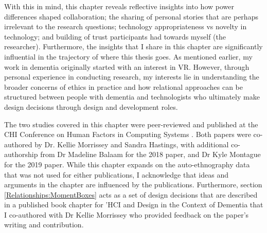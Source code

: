 With this in mind, this chapter reveals reflective insights into how power differences shaped collaboration; the sharing of personal stories that are perhaps irrelevant to the research questions; technology appropriateness vs novelty in technology; and building of trust participants had towards myself (the researcher). Furthermore, the insights that I share in this chapter are significantly influential in the trajectory of where this thesis goes. As mentioned earlier, my work in dementia originally started with an interest in VR. However, through personal experience in conducting research, my interests lie in understanding the broader concerns of ethics in practice and how relational approaches can be structured between people with dementia and technologists who ultimately make design decisions through design and development roles.


The two studies covered in this chapter were peer-reviewed and published at the CHI Conference on Human Factors in Computing Systems \citep{hodge_exploring_2018,hodge_exploring_2019}. Both papers were co-authored by Dr. Kellie Morrissey and Sandra Hastings, with additional co-authorship from Dr Madeline Balaam for the 2018 paper, and Dr Kyle Montague for the 2019 paper. While this chapter expands on the auto-ethnography data that was not used for either publications, I acknowledge that ideas and arguments in the chapter are influenced by the publications. Furthermore, section \ref{Relationships:MomentBoxes} acts as a set of design decisions that are described in a published book chapter for 'HCI and Design in the Context of Dementia \citep{hodge2020sharing} that I co-authored with Dr Kellie Morrissey who provided feedback on the paper's writing and contribution. 

